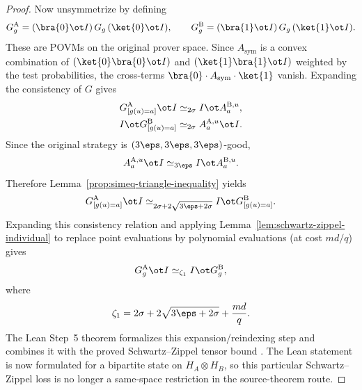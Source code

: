 \begin{proof}
	Now unsymmetrize by defining
	\[
		G_g^{\mathrm A} = (\bra{0} \ot I)\, G_g\, (\ket{0} \ot I),
		\qquad
		G_g^{\mathrm B} = (\bra{1} \ot I)\, G_g\, (\ket{1} \ot I).
	\]
	These are POVMs on the original prover space. Since $A_{\mathrm{sym}}$ is a convex combination of $(\ket{0}\bra{0} \ot I)$ and $(\ket{1}\bra{1} \ot I)$ weighted by the test probabilities, the cross-terms $\bra{0} \cdot A_{\mathrm{sym}} \cdot \ket{1}$ vanish. Expanding the consistency of $G$ gives
	\begin{gather}
		G_{[g(u)=a]}^{\mathrm A} \ot I \simeq_{2\sigma} I \ot A_a^{\mathrm B,u}, \label{eq:cons-a}\\
		I \ot G_{[g(u)=a]}^{\mathrm B} \simeq_{2\sigma} A_a^{\mathrm A,u} \ot I. \label{eq:cons-b}
	\end{gather}
	Since the original strategy is $(3\eps,3\eps,3\eps)$-good,
	\[
		A_a^{\mathrm A,u} \ot I \simeq_{3\eps} I \ot A_a^{\mathrm B,u}.
	\]
	Therefore Lemma~\ref{prop:simeq-triangle-inequality} yields
	\[
		G_{[g(u)=a]}^{\mathrm A} \ot I \simeq_{2\sigma + 2\sqrt{3\eps+2\sigma}} I \ot G_{[g(u)=a]}^{\mathrm B}.
	\]
	Expanding this consistency relation and applying Lemma~\ref{lem:schwartz-zippel-individual} to replace point evaluations by polynomial evaluations (at cost $md/q$) gives
	\begin{equation}\label{eq:G-self-consistency}
		G_g^{\mathrm A} \ot I \simeq_{\zeta_1} I \ot G_g^{\mathrm B},
	\end{equation}
	where
	\[
		\zeta_1 = 2\sigma + 2\sqrt{3\eps+2\sigma} + \frac{md}{q}.
	\]
	The Lean Step~5 theorem
	formalizes this expansion/reindexing step and combines it with the proved
	Schwartz--Zippel tensor bound
	.  The
	Lean statement is now formulated for a bipartite state on
	\(H_A\otimes H_B\), so this particular Schwartz--Zippel loss is no longer a
	same-space restriction in the source-theorem route.


\end{proof}
